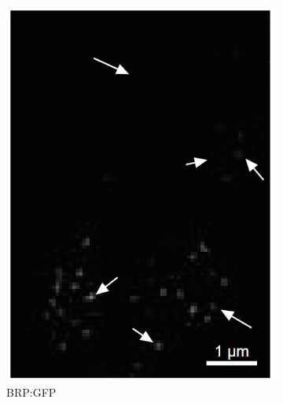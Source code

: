 \begin{figure}
	
	\begin{subfigure}[t]{0.237\textwidth}
		\centering
		\includegraphics[width=\linewidth]{images/DeepSIM_NMJ_woAO_ROI1_GFP.jpg}
		\caption{BRP:GFP}
		\label{fig:DeepSIM_NMJ_woAO_ROI1_GFP}
	\end{subfigure}
	\begin{subfigure}[t]{0.235\textwidth}
		\centering

\end{subfigure}
\end{figure}
